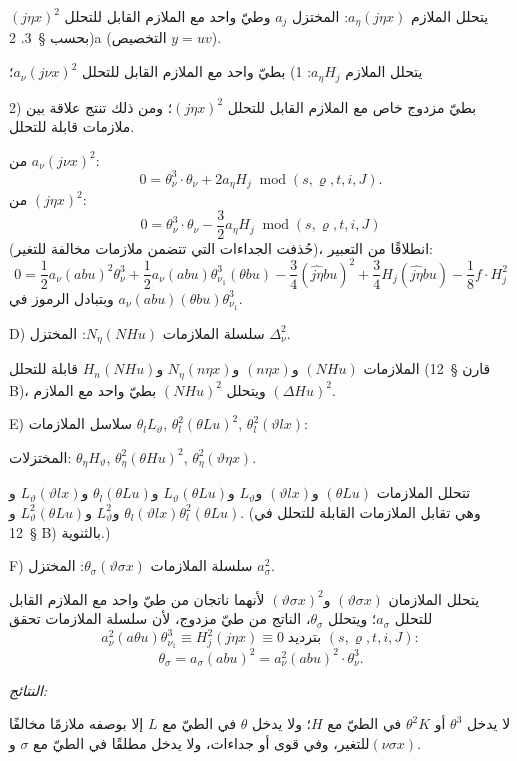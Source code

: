 \documentclass[11pt]{article}
\providecommand{\A}{\Delta}
\providecommand{\R}{\varrho}
\providecommand{\modu}[1]{\;\operatorname{mod} #1}
\begin{document}
يتحلل الملازم $a_\eta(j\eta x)$: المختزل $a_j$ وطيّ واحد مع الملازم القابل للتحلل $(j\eta x)^2$ بحسب \S\ 3. 2)a (التخصيص $y=uv$).

يتحلل الملازم $a_\eta H_j$: 1) بطيّ واحد مع الملازم القابل للتحلل $a_\nu(j\nu x)^2$؛

2) بطيّ مزدوج خاص مع الملازم القابل للتحلل $(j\eta x)^2$؛ ومن ذلك تنتج علاقة بين ملازمات قابلة للتحلل.

من $a_\nu(j\nu x)^2$:
\[
0=\theta_\nu^3\cdot\theta_\nu+2a_\eta H_j\modu{(s,\R,t,i,J)}.
\]
من $(j\eta x)^2$:
\[
0=\theta_\nu^3\cdot\theta_\nu-\frac32a_\eta H_j\modu{(s,\R,t,i,J)}
\]
(حُذفت الجداءات التي تتضمن ملازمات مخالفة للتغير)، انطلاقًا من التعبير:
\[
0=\frac12a_\nu(abu)^2\theta_\nu^3
+\frac12a_\nu(abu)\theta_{\nu_1}^3(\theta bu)
-\frac34(\widehat{j\eta}bu)^2+\frac34H_j(\widehat{j\eta}bu)
-\frac18f\cdot H_j^2
\]
وبتبادل الرموز في $a_\nu(abu)(\theta bu)\theta_{\nu_1}^3$.

\noindent D) سلسلة الملازمات $N_\eta(NHu)$: المختزل $\A_\nu^2$.

الملازمات $(NHu)$ و$(n\eta x)$ و$N_\eta(n\eta x)$ و$H_n(NHu)$ قابلة للتحلل (قارن \S\ 12 B)، ويتحلل $(NHu)^2$ بطيّ واحد مع الملازم $(\A Hu)^2$.

\noindent E) سلاسل الملازمات $\theta_lL_\vartheta$, $\theta_l^2(\theta Lu)^2$, $\theta_l^2(\vartheta lx)$:

المختزلات: $\theta_\eta H_\vartheta$, $\theta_\eta^2(\theta Hu)^2$, $\theta_\eta^2(\vartheta\eta x)$.

تتحلل الملازمات $(\theta Lu)$ و$(\vartheta lx)$ و$L_\vartheta$ و$L_\vartheta(\theta Lu)$ و$\theta_l(\theta Lu)$ و$L_\vartheta(\vartheta lx)$ و$\theta_l(\vartheta lx)$ و$L_\vartheta^2$ و$L_\vartheta^2(\theta Lu)$ و$\theta_l^2(\theta Lu)$. (وهي تقابل الملازمات القابلة للتحلل في \S\ 12 B) بالثنوية.)

\noindent F) سلسلة الملازمات $\theta_\sigma(\vartheta\sigma x)$: المختزل $a_\sigma^2$.

يتحلل الملازمان $(\vartheta\sigma x)$ و$(\vartheta\sigma x)^2$ لأنهما ناتجان من طيّ واحد مع الملازم القابل للتحلل $a_\sigma$؛ ويتحلل $\theta_\sigma$، الناتج من طيّ مزدوج، لأن سلسلة الملازمات تحقق
\[
a_\nu^2(a\theta u)\theta_{\nu_1}^3\equiv H_j^2(j\eta x)\equiv0\;\text{بترديد }(s,\R,t,i,J):
\]
\[
\theta_\sigma=a_\sigma(abu)^2=a_\nu^2(abu)^2\cdot\theta_\nu^3.
\]

\noindent\emph{النتائج:}

لا يدخل $\theta^3$ أو $\theta^2K$ في الطيّ مع $H$؛ ولا يدخل $\theta$ في الطيّ مع $L$ إلا بوصفه ملازمًا مخالفًا للتغير، وفي قوى أو جداءات، ولا يدخل مطلقًا في الطيّ مع $\sigma$ و$(\nu\sigma x)$.
\end{document}
